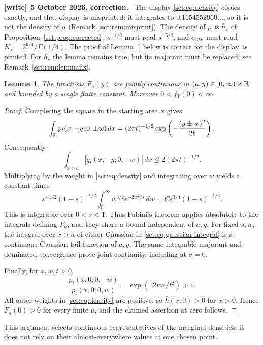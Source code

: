 \documentclass[11pt,letterpaper]{article}
\newtheorem{lemma}[theorem]{Lemma}
\theoremstyle{definition}\newtheorem{remark}[theorem]{Remark}
\newcommand{\fY}{f_Y}\newcommand{\code}[1]{\texttt{#1}}
\newcommand{\hstar}{\bar h_\star}\newcommand{\fstar}{f_\star}\newcommand{\Kstar}{K_\star}
\newenvironment{writenote}[1][]{\par\smallskip\begingroup\small
 \noindent\textbf{[write]}\if\relax\detokenize{#1}\relax\else~\textbf{#1.}\fi\ }%
 {\par\endgroup\smallskip}
\begin{document}
\begin{writenote}[5 October 2026, correction]
The display \eqref{sct:eq:density} copies \cite[p.~170]{dw} exactly, and that display is misprinted: it integrates to $0.1154552960\ldots$, so it is not the density of $\mu$ (Remark~\ref{sct:rem:misprint}). The density of $\mu$ is $\hstar$ of Proposition~\ref{sct:prop:corrected}: $s^{-1/2}$ must read $s^{-5/2}$, and $c_{\mathrm{DW}}$ must read $\Kstar=2^{9/4}/\Gamma(1/4)$. The proof of Lemma~\ref{sct:lem:marginal} below is correct for the display as printed. For $\hstar$ the lemma remains true, but its majorant must be replaced; see Remark~\ref{sct:rem:lemmafix}.
\end{writenote}
\begin{lemma}\label{sct:lem:marginal}
The functions $F_a(y)$ are jointly continuous in $(a,y)\in[0,\infty)\times\mathbb R$
and bounded by a single finite constant. Moreover $0<\fY(0)<\infty$.
\end{lemma}
\begin{proof}
Completing the square in the starting area $x$ gives
\begin{equation}\label{sct:eq:gaussian-integral}
 \int_\mathbb R p_t(x,-y;0,\pm w)\,dx
   =(2\pi t)^{-1/2}\exp\left(-\frac{(y\pm w)^2}{2t}\right).
\end{equation}
Consequently
\[
 \int_{x>a}|q_t(x,-y;0,-w)|\,dx\le2(2\pi t)^{-1/2}.
\]
Multiplying by the weight in \eqref{sct:eq:density} and integrating over $w$
yields a constant times
\[
 s^{-1/2}(1-s)^{-1/2}\int_0^\infty w^{3/2}e^{-2w^2/s}\,dw
 =C s^{3/4}(1-s)^{-1/2}.
\]
This is integrable over $0<s<1$. Thus Fubini's theorem applies absolutely to
the integrals defining $F_a$, and they share a bound independent of $a,y$.
For fixed $s,w$, the integral over $x>a$ of either Gaussian in
\eqref{sct:eq:gaussian-integral} is a continuous Gaussian-tail function of $a,y$.
The same integrable majorant and dominated convergence prove joint continuity,
including at $a=0$.

Finally, for $x,w,t>0$,
\[
 \frac{p_t(x,0;0,-w)}{p_t(x,0;0,w)}
 =\exp(12wx/t^2)>1.
\]
All outer weights in \eqref{sct:eq:density} are positive, so
$\bar h(x,0)>0$ for $x>0$. Hence $F_a(0)>0$ for every finite $a$, and the
claimed assertion at zero follows.
\end{proof}
This argument selects continuous representatives of the marginal densities;
it does not rely on their almost-everywhere values at one chosen point.
\end{document}
